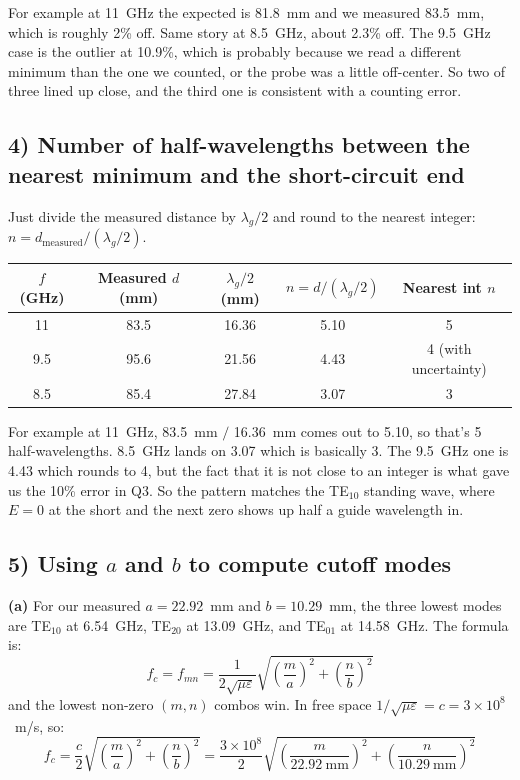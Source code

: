 \documentclass[11pt,letterpaper]{article}
\begin{document}
For example at 11~GHz the expected is 81.8~mm and we measured 83.5~mm, which is roughly 2\% off. Same story at 8.5~GHz, about 2.3\% off. The 9.5~GHz case is the outlier at 10.9\%, which is probably because we read a different minimum than the one we counted, or the probe was a little off-center. So two of three lined up close, and the third one is consistent with a counting error.

\subsection*{4) Number of half-wavelengths between the nearest minimum and the short-circuit end}

Just divide the measured distance by $\lambda_g/2$ and round to the nearest integer: $n = d_\text{measured} / (\lambda_g/2)$.

\begin{center}
\begin{tabular}{ccccc}
\toprule
$f$ (GHz) & Measured $d$ (mm) & $\lambda_g/2$ (mm) & $n = d/(\lambda_g/2)$ & Nearest int $n$ \\
\midrule
11   & 83.5 & 16.36 & 5.10 & 5 \\
9.5  & 95.6 & 21.56 & 4.43 & 4 (with uncertainty) \\
8.5  & 85.4 & 27.84 & 3.07 & 3 \\
\bottomrule
\end{tabular}
\end{center}

For example at 11~GHz, 83.5~mm $/$ 16.36~mm comes out to 5.10, so that's 5 half-wavelengths. 8.5~GHz lands on 3.07 which is basically 3. The 9.5~GHz one is 4.43 which rounds to 4, but the fact that it is not close to an integer is what gave us the 10\% error in Q3. So the pattern matches the TE$_{10}$ standing wave, where $E = 0$ at the short and the next zero shows up half a guide wavelength in.

\subsection*{5) Using $a$ and $b$ to compute cutoff modes}

\textbf{(a)} For our measured $a = 22.92$~mm and $b = 10.29$~mm, the three lowest modes are TE$_{10}$ at 6.54~GHz, TE$_{20}$ at 13.09~GHz, and TE$_{01}$ at 14.58~GHz. The formula is:
\[
f_c = f_{mn} = \frac{1}{2\sqrt{\mu\varepsilon}}\sqrt{\left(\frac{m}{a}\right)^2 + \left(\frac{n}{b}\right)^2}
\]
and the lowest non-zero $(m,n)$ combos win. In free space $1/\sqrt{\mu\varepsilon} = c = 3\times10^{8}$~m/s, so:
\[
f_c = \frac{c}{2}\sqrt{\left(\frac{m}{a}\right)^2 + \left(\frac{n}{b}\right)^2} = \frac{3\times10^{8}}{2}\sqrt{\left(\frac{m}{22.92~\text{mm}}\right)^2 + \left(\frac{n}{10.29~\text{mm}}\right)^2}
\]
\end{document}
